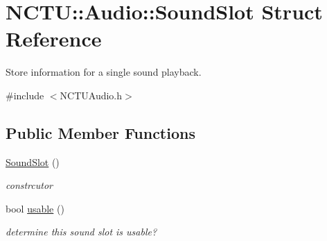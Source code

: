 \hypertarget{struct_n_c_t_u_1_1_audio_1_1_sound_slot}{}\section{N\+C\+TU\+:\+:Audio\+:\+:Sound\+Slot Struct Reference}
\label{struct_n_c_t_u_1_1_audio_1_1_sound_slot}


Store information for a single sound playback.  




{\ttfamily \#include $<$N\+C\+T\+U\+Audio.\+h$>$}

\subsection*{Public Member Functions}
\begin{DoxyCompactItemize}
\item 
\hyperlink{struct_n_c_t_u_1_1_audio_1_1_sound_slot_a0639f62320cd31b59cc3d2f55a42eb97}{Sound\+Slot} ()\hypertarget{struct_n_c_t_u_1_1_audio_1_1_sound_slot_a0639f62320cd31b59cc3d2f55a42eb97}{}\label{struct_n_c_t_u_1_1_audio_1_1_sound_slot_a0639f62320cd31b59cc3d2f55a42eb97}

\begin{DoxyCompactList}\small\item\em constrcutor \end{DoxyCompactList}\item 
bool \hyperlink{struct_n_c_t_u_1_1_audio_1_1_sound_slot_a7cd7272636c9801a16e29383181d7ad4}{usable} ()\hypertarget{struct_n_c_t_u_1_1_audio_1_1_sound_slot_a7cd7272636c9801a16e29383181d7ad4}{}\label{struct_n_c_t_u_1_1_audio_1_1_sound_slot_a7cd7272636c9801a16e29383181d7ad4}

\begin{DoxyCompactList}\small\item\em determine this sound slot is usable? \end{DoxyCompactList}\end{DoxyCompactItemize}
